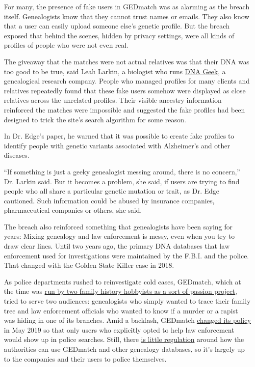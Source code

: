 For many, the presence of fake users in GEDmatch was as alarming as the
breach itself. Genealogists know that they cannot trust names or emails.
They also know that a user can easily upload someone else's genetic
profile. But the breach exposed that behind the scenes, hidden by
privacy settings, were all kinds of profiles of people who were not even
real.

The giveaway that the matches were not actual relatives was that their
DNA was too good to be true, said Leah Larkin, a biologist who runs
\href{https://thednageek.com/about/}{DNA Geek,} a genealogical research
company. People who managed profiles for many clients and relatives
repeatedly found that these fake users somehow were displayed as close
relatives across the unrelated profiles. Their visible ancestry
information reinforced the matches were impossible and suggested the
fake profiles had been designed to trick the site's search algorithm for
some reason.

In Dr. Edge's paper, he warned that it was possible to create fake
profiles to identify people with genetic variants associated with
Alzheimer's and other diseases.

``If something is just a geeky genealogist messing around, there is no
concern,'' Dr. Larkin said. But it becomes a problem, she said, if users
are trying to find people who all share a particular genetic mutation or
trait, as Dr. Edge cautioned. Such information could be abused by
insurance companies, pharmaceutical companies or others, she said.

The breach also reinforced something that genealogists have been saying
for years: Mixing genealogy and law enforcement is messy, even when you
try to draw clear lines. Until two years ago, the primary DNA databases
that law enforcement used for investigations were maintained by the
F.B.I. and the police. That changed with the Golden State Killer case in
2018.

As police departments rushed to reinvestigate cold cases, GEDmatch,
which at the time was
\href{https://www.nytimes3xbfgragh.onion/2018/10/15/science/gedmatch-genealogy-cold-cases.html}{run
by two family history hobbyists as a sort of passion project}, tried to
serve two audiences: genealogists who simply wanted to trace their
family tree and law enforcement officials who wanted to know if a murder
or a rapist was hiding in one of its branches. Amid a backlash, GEDmatch
\href{https://www.legalgenealogist.com/2019/05/19/gedmatch-reverses-course/}{changed
its policy} in May 2019 so that only users who explicitly opted to help
law enforcement would show up in police searches. Still, there
\href{https://www.nytimes3xbfgragh.onion/2019/10/05/us/genetic-genealogy-guidelines-privacy.html}{is
little regulation} around how the authorities can use GEDmatch and other
genealogy databases, so it's largely up to the companies and their users
to police themselves.

